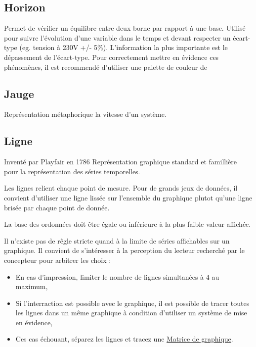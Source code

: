 \documentclass[a4paper,12pt]{article}
\begin{document}
\begin{multicols}{2}
\subsection*{Horizon}
\label{sec:org5313e77}
Permet de vérifier un équilibre entre deux borne par rapport à une base. \autocite{alansmithLexiqueVisuel}  Utilisé pour suivre l'évolution d'une variable dans le temps et devant respecter un écart-type (eg. tension à 230V +/- 5\%). L'information la plus importante est le dépassement de l'écart-type. Pour correctement mettre en évidence ces phénomènes, il est recommendé d'utiliser une palette de couleur de
\subsection*{Jauge}
\label{sec:org309f02d}
Représentation métaphorique la vitesse d'un système.
\subsection*{Ligne}
\label{sec:org12830d9}
Inventé par Playfair en 1786 \autocite{sosulskiBecomingVisual2019}
Représentation graphique standard et famillière pour la représentation des séries temporelles. \autocite[,@Schwabish2021p86]{alansmithLexiqueVisuel}

Les lignes relient chaque point de mesure. Pour de grands jeux de données, il convient d'utiliser une ligne lissée sur l'ensemble du graphique plutot qu'une ligne brisée par chaque point de donnée. \autocite{wilkeDirectoryVisualizations2019}

La base des ordonnées doit être égale ou inférieure à la plus faible valeur affichée. \autocite{Wong2010}

Il n'existe pas de rêgle stricte quand à la limite de séries affichables sur un graphique.\autocite{jonathanschwabishTime2021} Il convient de s'intéresser à la perception du lecteur recherché par le concepteur pour arbitrer les choix : \autocite{jonathanschwabishTime2021}
\begin{itemize}
\item En cas d'impression, limiter le nombre de lignes simultanées à 4 au maximum, \autocite{Wong2010}
\item Si l'interraction est possible avec le graphique, il est possible de tracer toutes les lignes dans un même graphique à condition d'utiliser un système de mise en évidence,\autocite{jonathanschwabishTime2021}
\item Ces cas échouant, séparez les lignes et tracez une \hyperref[sec:org4b7bab9]{Matrice de graphique}.
\end{itemize}


\end{multicols}
\end{document}
